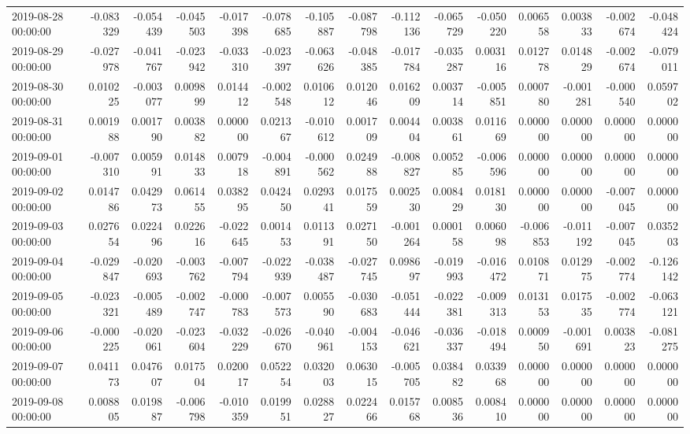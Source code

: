 \begin{tabular}{lrrrrrrrrrrrrrr}
2019-08-28 00:00:00 & -0.083329 & -0.054439 & -0.045503 & -0.017398 & -0.078685 & -0.105887 & -0.087798 & -0.112136 & -0.065729 & -0.050220 & 0.006558 & 0.003833 & -0.002674 & -0.048424 \\
2019-08-29 00:00:00 & -0.027978 & -0.041767 & -0.023942 & -0.033310 & -0.023397 & -0.063626 & -0.048385 & -0.017784 & -0.035287 & 0.003116 & 0.012778 & 0.014829 & -0.002674 & -0.079011 \\
2019-08-30 00:00:00 & 0.010225 & -0.003077 & 0.009899 & 0.014412 & -0.002548 & 0.010612 & 0.012046 & 0.016209 & 0.003714 & -0.005851 & 0.000780 & -0.001281 & -0.000540 & 0.059702 \\
2019-08-31 00:00:00 & 0.001988 & 0.001790 & 0.003882 & 0.000000 & 0.021367 & -0.010612 & 0.001709 & 0.004404 & 0.003861 & 0.011669 & 0.000000 & 0.000000 & 0.000000 & 0.000000 \\
2019-09-01 00:00:00 & -0.007310 & 0.005991 & 0.014833 & 0.007918 & -0.004891 & -0.000562 & 0.024988 & -0.008827 & 0.005285 & -0.006596 & 0.000000 & 0.000000 & 0.000000 & 0.000000 \\
2019-09-02 00:00:00 & 0.014786 & 0.042973 & 0.061455 & 0.038295 & 0.042450 & 0.029341 & 0.017559 & 0.002530 & 0.008429 & 0.018130 & 0.000000 & 0.000000 & -0.007045 & 0.000000 \\
2019-09-03 00:00:00 & 0.027654 & 0.022496 & 0.022616 & -0.022645 & 0.001453 & 0.011391 & 0.027150 & -0.001264 & 0.000158 & 0.006098 & -0.006853 & -0.011192 & -0.007045 & 0.035203 \\
2019-09-04 00:00:00 & -0.029847 & -0.020693 & -0.003762 & -0.007794 & -0.022939 & -0.038487 & -0.027745 & 0.098697 & -0.019993 & -0.016472 & 0.010871 & 0.012975 & -0.002774 & -0.126142 \\
2019-09-05 00:00:00 & -0.023321 & -0.005489 & -0.002747 & -0.000783 & -0.007573 & 0.005590 & -0.030683 & -0.051444 & -0.022381 & -0.009313 & 0.013153 & 0.017535 & -0.002774 & -0.063121 \\
2019-09-06 00:00:00 & -0.000225 & -0.020061 & -0.023604 & -0.032229 & -0.026670 & -0.040961 & -0.004153 & -0.046621 & -0.036337 & -0.018494 & 0.000950 & -0.001691 & 0.003823 & -0.081275 \\
2019-09-07 00:00:00 & 0.041173 & 0.047607 & 0.017504 & 0.020017 & 0.052254 & 0.032003 & 0.063015 & -0.005705 & 0.038482 & 0.033968 & 0.000000 & 0.000000 & 0.000000 & 0.000000 \\
2019-09-08 00:00:00 & 0.008805 & 0.019887 & -0.006798 & -0.010359 & 0.019951 & 0.028827 & 0.022466 & 0.015768 & 0.008536 & 0.008410 & 0.000000 & 0.000000 & 0.000000 & 0.000000 \\

\end{tabular}
